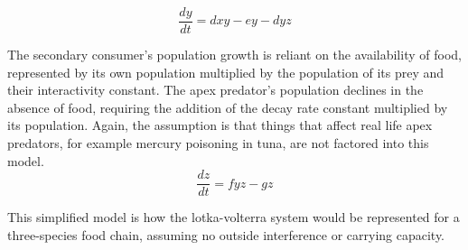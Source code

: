 \documentclass[11pt,oneside]{article}
\begin{document}
	\begin{equation}
	\frac{dy}{dt} = dxy - ey -dyz
	\end{equation}
	
	The secondary consumer's population growth is reliant on the availability of food, represented by its own population multiplied by the population of its prey and their interactivity constant. The apex predator's population declines in the absence of food, requiring the addition of the decay rate constant multiplied by its population. Again, the assumption is that things that affect real life apex predators, for example mercury poisoning in tuna, are not factored into this model.\\
	
	\begin{equation}
	\frac{dz}{dt} = fyz - gz
	\end{equation}
	
	This simplified model is how the lotka-volterra system would be represented for a three-species food chain, assuming no outside interference or carrying capacity.
	
	
\end{document}
